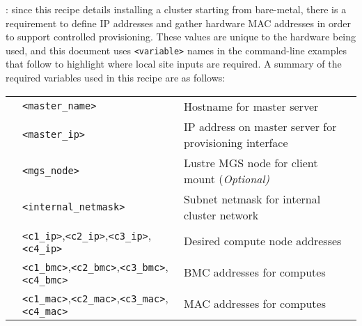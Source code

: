 : since this recipe details installing a cluster
starting from bare-metal, there is a requirement to define IP addresses and gather
hardware MAC addresses in order to support controlled provisioning. These values
are unique to the hardware being used, and this document uses \texttt{<variable>}
names in the command-line examples that follow to highlight where local site
inputs are required. A summary of the required variables used in this recipe
are as follows: \\

\vspace*{0.2cm}
\begin{tabular}{@{}>{\textbullet}cll@{}}
& \texttt{<master\_name>}  & Hostname for master server \\
& \texttt{<master\_ip>} & IP address on master server for provisioning
interface \\
& \texttt{<mgs\_node>} & Lustre MGS node for client mount (\em Optional)\\
& \texttt{<internal\_netmask>} & Subnet netmask for internal cluster network \\
& \texttt{<c1\_ip>},\texttt{<c2\_ip>},\texttt{<c3\_ip>},\texttt{<c4\_ip>}
& Desired compute node addresses \\
& \texttt{<c1\_bmc>},\texttt{<c2\_bmc>},\texttt{<c3\_bmc>},\texttt{<c4\_bmc>}
& BMC addresses for computes \\
& \texttt{<c1\_mac>},\texttt{<c2\_mac>},\texttt{<c3\_mac>},\texttt{<c4\_mac>}
& MAC addresses for computes \\
\end{tabular}
